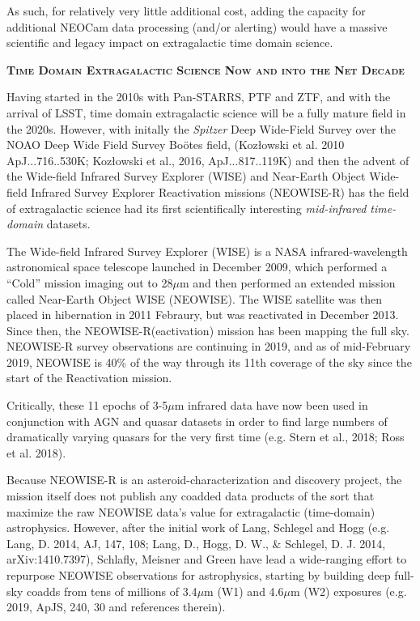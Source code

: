 \documentclass[12pt]{article}
\begin{document}
As such, for relatively very little additional cost, adding the
capacity for additional NEOCam data processing (and/or alerting) would
have a massive scientific and legacy impact on extragalactic time
domain science.


\pagebreak

\smallskip
\smallskip
\noindent
{\bfseries \textsc{\textcolor{Cerulean}{Time Domain Extragalactic Science Now and into the Net Decade}}}

\smallskip
\noindent
Having started in the 2010s with Pan-STARRS, PTF and ZTF, and with the
arrival of LSST, time domain extragalactic science will be a fully
mature field in the 2020s. However, with initally the {\it Spitzer}
Deep Wide-Field Survey over the NOAO Deep Wide Field Survey Bo\"{o}tes
field, (Koz{\l}owski et al. 2010 ApJ...716..530K; Koz{\l}owski et al.,
2016, ApJ...817..119K) and then the advent of the Wide-field Infrared
Survey Explorer (WISE) and Near-Earth Object Wide-field Infrared
Survey Explorer Reactivation missions (NEOWISE-R) has the field of
extragalactic science had its first scientifically interesting {\it
mid-infrared time-domain} datasets.

\smallskip
\noindent
The Wide-field Infrared Survey Explorer (WISE) is a NASA
infrared-wavelength astronomical space telescope launched in December
2009, which performed a ``Cold'' mission imaging out to 28$\mu$m and
then performed an extended mission called Near-Earth Object WISE
(NEOWISE). The WISE satellite was then placed in hibernation in 2011
Febraury, but was reactivated in December 2013.  Since then, the
NEOWISE-R(eactivation) mission has been mapping the full sky.
NEOWISE-R survey observations are continuing in 2019, and as of
mid-February 2019, NEOWISE is 40\% of the way through its 11th
coverage of the sky since the start of the Reactivation mission.

\smallskip
\noindent
Critically, these 11 epochs of 3-5$\mu$m infrared data have now been
used in conjunction with AGN and quasar datasets in order to find
large numbers of dramatically varying quasars for the very first time
(e.g. Stern et al., 2018; Ross et al. 2018).

\smallskip
\noindent
Because NEOWISE-R is an asteroid-characterization and discovery project, the mission itself does not publish any coadded data products of the sort that maximize the raw NEOWISE data’s value for extragalactic (time-domain) astrophysics. However, after the initial work of Lang, Schlegel and Hogg (e.g. Lang, D. 2014, AJ, 147, 108; Lang, D., Hogg, D. W., \& Schlegel, D. J. 2014, arXiv:1410.7397), Schlafly, Meisner and Green have lead a wide-ranging effort to repurpose NEOWISE observations for astrophysics, starting by building deep full-sky coadds from tens of millions of 3.4$\mu$m (W1) and 4.6$\mu$m (W2) exposures (e.g. 2019, ApJS, 240, 30 and references therein). 
\end{document}
